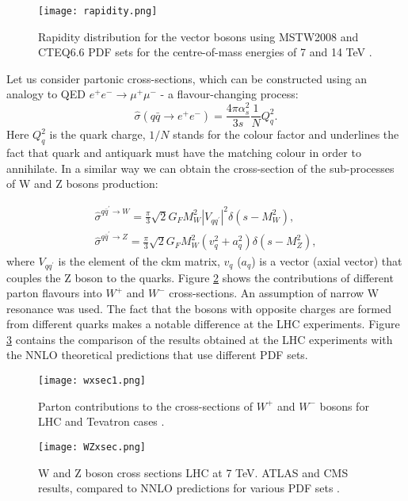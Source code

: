 		\begin{figure}[htbp]
			\centering
			\texttt{[image: rapidity.png]}
			\caption{ Rapidity distribution for the vector bosons using MSTW2008 and CTEQ6.6 PDF sets for the centre-of-mass energies of 7 and 14 TeV \cite{Halzen:2013bqa}.}
			\label{fig::Wrapidity}
		\end{figure}
		Let us consider partonic cross-sections, which can be constructed using an analogy to QED $e^{+}e^{-}\rightarrow \mu^{+}\mu^{-}$ - a flavour-changing process:
		\begin{equation}
			\hat{\sigma}(q\bar q \rightarrow e^{+}e^{-}) = \frac{4\pi \alpha_s^2}{3s}\frac{1}{N}Q^2_q.
		\end{equation}	
		Here $Q^2_q$ is the quark charge, $1/N$ stands for the colour factor and underlines the fact that quark and antiquark must have the matching colour in order to annihilate. In a similar way we can obtain the cross-section of the sub-processes of W and Z bosons production:

		\begin{equation}
		\begin{array}{lcl} 
		\hat{\sigma}^{q\bar q^\prime \rightarrow W}= \frac{\pi }{3}\sqrt{2}G_FM^2_W|V_{qq^\prime}|^2\delta(s-M^2_W),\\
		\hat{\sigma}^{q\bar q^\prime \rightarrow Z}= \frac{\pi }{3}\sqrt{2}G_FM^2_W(v^2_q+a^2_q)\delta(s-M^2_Z),
		\end{array}
		\end{equation}	
		where $V_{qq^\prime}$ is the element of the \gls{ckm} matrix,  $v_q$ ($a_q$) is a vector (axial vector) that couples the Z boson to the quarks. Figure \ref{fig::wxsec} shows the contributions of different parton flavours into $W^+$ and $W^-$ cross-sections. An assumption of narrow W resonance was used. The fact that the bosons with opposite charges are formed from different quarks makes a notable difference at the LHC experiments. Figure \ref{fig::wzxsec} contains the comparison of the results obtained at the LHC experiments with the NNLO theoretical predictions that use different PDF sets.
		\begin{figure}[htbp]
			\centering
			\texttt{[image: wxsec1.png]}
			\caption{Parton contributions to the cross-sections of $W^+$ and $W^-$ bosons for LHC and Tevatron cases \cite{Martin:392675}.}
			\label{fig::wxsec}
		\end{figure}
		\begin{figure}[htbp]
		\texttt{[image: WZxsec.png]}
		\caption{W and Z boson cross sections LHC at 7 TeV. ATLAS and CMS results, compared to NNLO predictions for various PDF sets \cite{Mangano:2015ejw}.}
		\label{fig::wzxsec}
		\end{figure}

